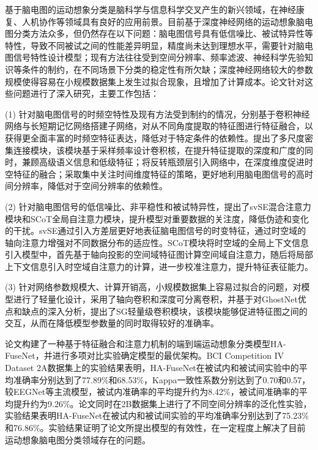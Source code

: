 
基于脑电图的运动想象分类是脑科学与信息科学交叉产生的新兴领域，在神经康复、人机协作等领域具有良好的应用前景。目前基于深度神经网络的运动想象脑电图分类方法众多，但仍然存在以下问题：脑电图信号具有低信噪比、被试特异性等特性，导致不同被试之间的性能差异明显，精度尚未达到理想水平，需要针对脑电图信号特性设计模型；现有方法往往受到空间分辨率、频率滤波、神经科学先验知识等条件的制约，在不同场景下分类的稳定性有所欠缺；深度神经网络较大的参数规模使得容易在小规模数据集上发生过拟合现象，且增加了计算成本。论文针对这些问题进行了深入研究，主要工作包括：

(1) 针对脑电图信号的时频空特性及现有方法受到制约的情况，分别基于卷积神经网络与长短期记忆网络搭建子网络，对从不同角度提取的特征图进行特征融合，以获得更全面丰富的时频空特征表达，降低对于特定条件的依赖性。提出了多尺度密集连接模块，该模块基于采样频率设计卷积核，在提升特征提取的深度和广度的同时，兼顾高级语义信息和低级特征；将反转瓶颈层引入网络中，在深度维度促进时空特征的融合；采取集中关注时间维度特征的策略，更好地利用脑电图信号的高时间分辨率，降低对于空间分辨率的依赖性。

(2) 针对脑电图信号的低信噪比、非平稳性和被试特异性，提出了svSE混合注意力模块和SCoT全局自注意力模块，提升模型对重要数据的关注度，降低伪迹和变化的干扰。svSE通过引入方差层更好地表征脑电图信号的时变特征，通过时空域的轴向注意力增强对不同数据分布的适应性。SCoT模块将时空域的全局上下文信息引入模型中，首先基于轴向投影的空间域特征图计算空间域自注意力，随后将局部上下文信息引入时空域自注意力的计算，进一步校准注意力，提升特征表征能力。

(3) 针对网络参数规模大、计算开销高，小规模数据集上容易过拟合的问题，对模型进行了轻量化设计，采用了轴向卷积和深度可分离卷积，并基于对GhostNet优点和缺点的深入分析，提出了SG轻量级卷积模块，该模块能够促进特征图之间的交互，从而在降低模型参数量的同时取得较好的准确率。

论文构建了一种基于特征融合和注意力机制的端到端运动想象分类模型HA-FuseNet，并进行多项对比实验确定模型的最优架构。BCI Competition IV Dataset 2A数据集上的实验结果表明，HA-FuseNet在被试内和被试间实验中的平均准确率分别达到了77.89\%和68.53\%，Kappa一致性系数分别达到了0.70和0.57，较EEGNet等主流模型，被试内准确率的平均提升约为8.42\%，被试间准确率的平均提升约为9.26\%。论文同时在2B数据集上进行了不同空间分辨率的泛化性实验，实验结果表明HA-FuseNet在被试内和被试间实验的平均准确率分别达到了75.23\%和76.86\%。实验结果证明了论文所提出模型的有效性，在一定程度上解决了目前运动想象脑电图分类领域存在的问题。